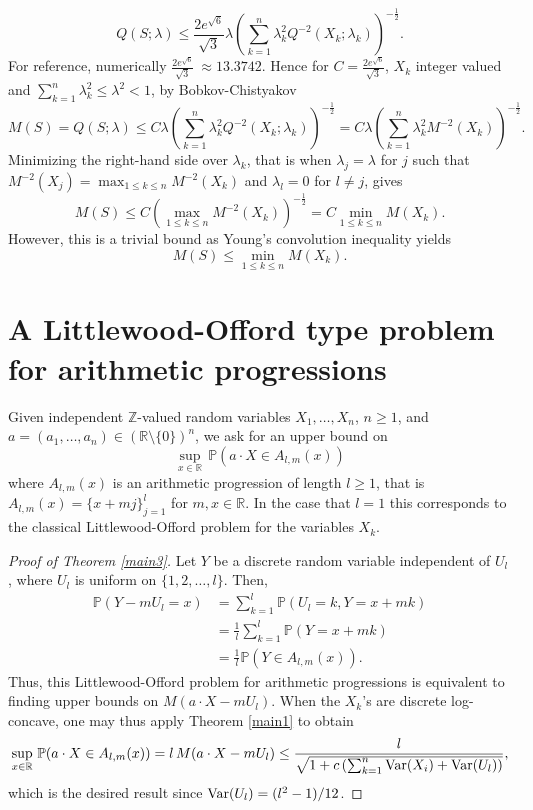 \documentclass[11pt]{article}
\newcommand{\R}{\mathbb{R}}
\DeclareMathOperator{\Var}{Var}
\newcommand{\1}{[1]}
\def\Var{{\rm Var}}
\begin{document}
    \[
        Q(S; \lambda) \leq  \frac{2 e^{\sqrt{6}}}{\sqrt{3}} \lambda  \left( \sum_{k=1}^n \lambda_k^2 Q^{-2}(X_k; \lambda_k) \right)^{- \frac 1 2}.
    \]
For reference, numerically $\frac{2 e^{\sqrt{6}}}{\sqrt{3}} \ \approx 13.3742$. Hence for $C =\frac{2 e^{\sqrt{6}}}{\sqrt{3}} $, $X_k$ integer valued and $\sum_{k=1}^n \lambda_k^2 \leq \lambda^2 < 1$, by Bobkov-Chistyakov
\[
    M(S) = Q(S; \lambda) \leq C \lambda \left( \sum_{k=1}^n \lambda_k^2 Q^{-2}(X_k; \lambda_k ) \right)^{- \frac 1 2} = C \lambda \left( \sum_{k=1}^n \lambda_k^2 M^{-2}(X_k )\right)^{- \frac 1 2}.
\]
Minimizing the right-hand side over $\lambda_k$, that is when $\lambda_j = \lambda$ for $j$ such that $M^{-2}(X_j) = \max_{1 \leq k \leq n} M^{-2}(X_k)$ and $\lambda_l = 0$ for $l \neq j$, gives
\[
    M(S) \leq C \left( \max_{1 \leq k \leq n} M^{-2}(X_k) \right)^{- \frac 1 2} = C \min_{1 \leq k \leq n} M(X_k).
\]
However, this is a trivial bound as Young's convolution inequality yields 
$$ M(S) \leq \min_{1 \leq k \leq n} M(X_k). $$







\section{A Littlewood-Offord type problem for arithmetic progressions}\label{4}

Given independent $\mathbb{Z}$-valued random variables $X_1, \dots, X_n$, $n \geq 1$, and $a = (a_1, \dots, a_n) \in (\mathbb{R} \setminus \{0\} )^n$, we ask for an upper bound on 
\[
    \sup_{x \in \R} \, \mathbb{P}(a \cdot X \in A_{l,m}(x))
\]
where $A_{l,m}(x)$ is an arithmetic progression of length $l \geq 1$, that is $A_{l,m}(x) = \{x + mj \}_{j=1}^l$ for $m, x \in \mathbb{R}$.  In the case that $l = 1$ this corresponds to the classical Littlewood-Offord problem for the variables $X_k$.

\begin{proof}[Proof of Theorem \ref{main3}]
Let $Y$ be a discrete random variable independent of $U_l$, where $U_l$ is uniform on $\{1,2,\dots, l\}$. Then,
\begin{align*}
    \mathbb{P}(Y - m U_l = x) 
        &= 
            \sum_{k=1}^l \mathbb{P}(U_l = k, Y = x + mk ) 
                \\
        &=
            \frac 1 l \sum_{k=1}^l \mathbb{P}(Y = x +mk)
                \\
        &=
            \frac 1 l \mathbb{P}( Y \in A_{l,m}(x)).
\end{align*}
Thus, this Littlewood-Offord problem for arithmetic progressions is equivalent to finding upper bounds on $M(a \cdot X - m U_l)$. When the $X_k$'s are discrete log-concave, one may thus apply Theorem \ref{main1} to obtain
$$ \sup_{x \in \R} \, \mathbb{P}(a \cdot X \in A_{l,m}(x)) = l \, M(a \cdot X - m U_l) \leq \frac{l}{\sqrt{1 + c \left( \sum_{k=1}^n \Var(X_i) + \Var(U_l) \right)}}, $$
which is the desired result since $\Var(U_l) = (l^2-1)/12$.
\end{proof}
\end{document}
